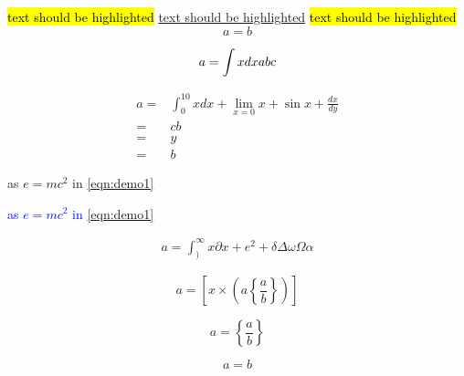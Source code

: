 \documentclass[a4paper,12pt]{article}%
\begin{document}
\hl{text should be highlighted}
\ul{text should be highlighted}
\hl{text should be highlighted}
\begin{equation}
a=b
\end{equation}



\begin{equation}
a=\int x dx\\ abc
\end{equation}

\blindtext
\begin{align}
a=&\int_0^{10} x dx+\lim_{x=0} x+ \sin x+\frac{d x}{d y}\nonumber\\=&cb\\
=&y\nonumber\\
=&b\label{eqn:demo1}
\end{align}

{\color{red}

\blindtext as $e=mc^2$ in \eqref{eqn:demo1}
}

\textcolor{blue}{
\blindtext as $e=mc^2$ in \eqref{eqn:demo1}
}





\begin{align}
a=\int_)^\infty x \partial x + e^2+\delta\Delta\omega\Omega\alpha
\end{align}







\begin{equation}
a=\left[x\times\left(a\left\{\frac{a}{b}\right\}\right)\right]
\end{equation}



\begin{equation}
a=\left\{\frac{a}{b}\right\}
\end{equation}



\begin{equation}
a=b
\end{equation}
\end{document}
